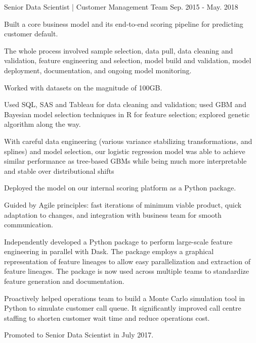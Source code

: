 \begin{cventries}
    \cventry
      {Senior Data Scientist | Customer Management Team} %
      {} %
      {} %
      {Sep. 2015 - May. 2018} %
      {
        \begin{cvitems} %
          \item {Built a core business model and its end-to-end scoring pipeline for predicting customer default.}\\
          \begin{cvitems}
            \item {The whole process involved sample selection, data pull, data cleaning and validation, feature engineering and selection, model build and validation, model deployment, documentation, and ongoing model monitoring.}
            \item {Worked with datasets on the magnitude of 100GB.}
            \item {Used SQL, SAS and Tableau for data cleaning and validation; used GBM and Bayesian model selection techniques in R for feature selection; explored genetic algorithm along the way.}
            \item {With careful data engineering (various variance stabilizing transformations, and splines) and model selection, our logistic regression model was able to achieve similar performance as tree-based GBMs while being much more interpretable and stable over distributional shifts}
            \item {Deployed the model on our internal scoring platform as a Python package.}
            \item {Guided by Agile principles: fast iterations of minimum viable product, quick adaptation to changes, and integration with business team for smooth communication.}\\
          \end{cvitems}
          \item {Independently developed a Python package to perform large-scale feature engineering in parallel with Dask. The package employs a graphical representation of feature lineages to allow easy parallelization and extraction of feature lineages. The package is now used across multiple teams to standardize feature generation and documentation.}
          \item {Proactively helped operations team to build a Monte Carlo simulation tool in Python to simulate customer call queue. It significantly improved call centre staffing to shorten customer wait time and reduce operations cost.}
          \item {Promoted to Senior Data Scientist in July 2017.}
        \end{cvitems}
      }

\end{cventries}
